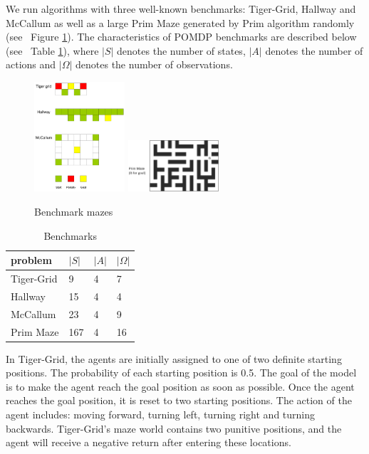 \documentclass{article}
\begin{document}
We run algorithms with three well-known benchmarks: Tiger-Grid, Hallway and McCallum 
as well as a large Prim Maze generated by Prim algorithm randomly
(see ~Figure \ref{fig:mazes}). The characteristics of POMDP benchmarks are described
below (see ~Table \ref{table:benchmarks}), where $|S|$ denotes the number of states,
$|A|$ denotes the number of actions and $|\Omega|$ denotes the number of observations.

\begin{figure}[h]
  \centering
    \includegraphics[width=0.30\textwidth]{mazes.png}
    \includegraphics[width=0.30\textwidth]{06-13-21-48/prim_maze_with_caption.png}
  \caption{Benchmark mazes}
  \label{fig:mazes}
\end{figure}

\begin{table}[h]
  \caption{Benchmarks}
  \label{table:benchmarks}
  \centering
  \begin{tabular}{llll}
    \toprule
    problem         & $|S|$           & $|A|$          & $|\Omega|$\\
    \midrule
    Tiger-Grid      & 9              & 4              & 7        \\
    Hallway         & 15           & 4              & 4        \\
    McCallum        & 23              & 4              & 9        \\
    Prim Maze        & 167              & 4              & 16        \\
    \bottomrule
  \end{tabular}
\end{table}

In Tiger-Grid, the agents are initially assigned to one of two definite starting positions.
The probability of each starting position is 0.5. The goal of the model is to make the agent
reach the goal position as soon as possible. Once the agent reaches the goal position,
it is reset to two starting positions. The action of the agent includes: moving forward, turning left,
turning right and turning backwards. Tiger-Grid's maze world contains two punitive positions,
and the agent will receive a negative return after entering these locations. 
\end{document}
